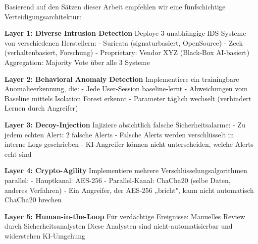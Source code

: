 \documentclass[a4paper,12pt]{article}
\theoremstyle{definition}
\begin{document}
Basierend auf den Sätzen dieser Arbeit empfehlen wir eine fünfschichtige Verteidigungsarchitektur:

\begin{algorithm}[H]
\caption{Redundante KI-resiliente Sicherheitsarchitektur für Bechtle}
\label{alg:bechtle_defense}
\begin{algorithmic}[1]
\State \textbf{Layer 1: Diverse Intrusion Detection}
\State Deploye 3 unabhängige IDS-Systeme von verschiedenen Herstellern:
\State \quad - Suricata (signaturbasiert, OpenSource)
\State \quad - Zeek (verhaltenbasiert, Forschung)
\State \quad - Proprietary: Vendor XYZ (Black-Box AI-basiert)
\State Aggregation: Majority Vote über alle 3 Systeme

\State \textbf{Layer 2: Behavioral Anomaly Detection}
\State Implementiere ein trainingbare Anomalieerkennung, die:
\State \quad - Jede User-Session baseline-lernt
\State \quad - Abweichungen vom Baseline mittels Isolation Forest erkennt
\State \quad - Parameter täglich wechselt (verhindert Lernen durch Angreifer)

\State \textbf{Layer 3: Decoy-Injection}
\State Injiziere absichtlich falsche Sicherheitsalarme:
\State \quad - Zu jedem echten Alert: 2 falsche Alerts
\State \quad - Falsche Alerts werden verschlüsselt in interne Logs geschrieben
\State \quad - KI-Angreifer können nicht unterscheiden, welche Alerts echt sind

\State \textbf{Layer 4: Crypto-Agility}
\State Implementiere mehrere Verschlüsselungsalgorithmen parallel:
\State \quad - Hauptkanal: AES-256
\State \quad - Parallel-Kanal: ChaCha20 (selbe Daten, anderes Verfahren)
\State \quad - Ein Angreifer, der AES-256 „bricht", kann nicht automatisch ChaCha20 brechen

\State \textbf{Layer 5: Human-in-the-Loop}
\State Für verdächtige Ereignisse: Manuelles Review durch Sicherheitsanalysten
\State Diese Analysten sind nicht-automatisierbar und widerstehen KI-Umgehung
\end{algorithmic}
\end{algorithm}
\end{document}
